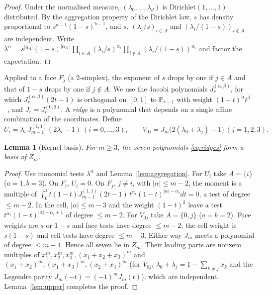\documentclass[11pt,a4paper]{article}
\newtheorem{lemma}[theorem]{Lemma}
\theoremstyle{definition}
\theoremstyle{remark}
\newcommand{\Pol}{\mathbb P}
\newcommand{\J}{J}
\begin{document}
\begin{proof}
Under the normalised measure, \((\lambda_0,\dots,\lambda_d)\) is
Dirichlet\((1,\dots,1)\) distributed. By the aggregation property of the
Dirichlet law, \(s\) has density proportional to \(s^{a-1}(1-s)^{b-1}\),
and \(s\), \((\lambda_i/s)_{i\in A}\) and \((\lambda_i/(1-s))_{i\notin A}\)
are independent. Write
\(\lambda^\alpha=s^{|\alpha_A|}(1-s)^{|\alpha_{A^c}|}\prod_{i\in A}(\lambda_i/s)^{\alpha_i}
\prod_{i\notin A}(\lambda_i/(1-s))^{\alpha_i}\) and factor the expectation.
\end{proof}

Applied to a face \(F_j\) (a 2-simplex), the exponent of \(s\) drops by one
if \(j\in A\) and that of \(1-s\) drops by one if \(j\notin A\). We use the
Jacobi polynomials \(\J_r^{(\alpha,\beta)}\), for which
\(\J_r^{(\alpha,\beta)}(2t-1)\) is orthogonal on \([0,1]\) to
\(\Pol_{r-1}\) with weight \((1-t)^\alpha t^\beta\)~\cite[\S18.3]{DLMF},
and \(\J_r=\J_r^{(0,0)}\). A \emph{ridge} is a polynomial that depends on a
single affine combination of the coordinates. Define
\begin{equation}
 U_i=\lambda_i\,\J_{m-1}^{(1,1)}(2\lambda_i-1)\ (i=0,\dots,3),\qquad
 V_{0j}=\J_m\bigl(2(\lambda_0+\lambda_j)-1\bigr)\ (j=1,2,3).
 \label{eq:ridges}
\end{equation}

\begin{lemma}[Kernel basis]
\label{lem:ridges}
For \(m\ge3\), the seven polynomials \eqref{eq:ridges} form a basis of
\(Z_m\).
\end{lemma}

\begin{proof}
Use monomial tests \(\lambda^\alpha\) and Lemma~\ref{lem:aggregation}.
For \(U_i\) take \(A=\{i\}\) (\(a=1,b=3\)). On \(F_i\), \(U_i=0\). On \(F_j\),
\(j\ne i\), with \(|\alpha|\le m-2\), the moment is a multiple of
\(\int_0^1t(1-t)\J^{(1,1)}_{m-1}(2t-1)\,t^{\alpha_i}(1-t)^{|\alpha|-\alpha_i}dt=0\),
a test of degree \(\le m-2\). In the cell, \(|\alpha|\le m-3\) and the
weight \((1-t)^2\) leave a test \(t^{\alpha_i}(1-t)^{|\alpha|-\alpha_i+1}\)
of degree \(\le m-2\). For \(V_{0j}\) take \(A=\{0,j\}\) (\(a=b=2\)). Face weights
are \(s\) or \(1-s\) and face tests have degree \(\le m-2\); the cell weight
is \(s(1-s)\) and cell tests have degree \(\le m-3\). Either way \(\J_m\)
meets a polynomial of degree \(\le m-1\). Hence all seven lie in \(Z_m\).
Their leading parts are nonzero multiples of \(x_1^m,x_2^m,x_3^m,
(x_1+x_2+x_3)^m\) and \((x_1+x_2)^m,(x_1+x_3)^m,(x_2+x_3)^m\) (for
\(V_{0j}\), \(\lambda_0+\lambda_j=1-\sum_{k\ne j}x_k\) and the Legendre
parity \(\J_m(-t)=(-1)^m\J_m(t)\)), which are independent. Lemma~\ref{lem:upper}
completes the proof.
\end{proof}
\end{document}
